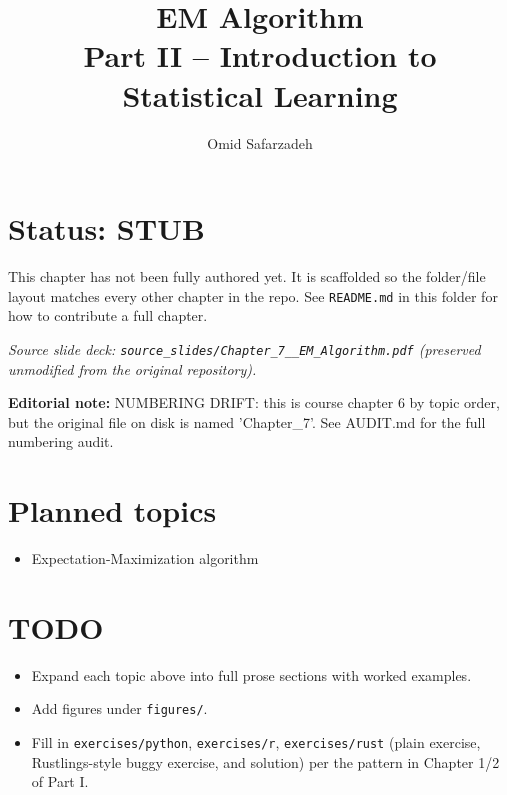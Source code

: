 \documentclass[11pt]{article}
\title{EM Algorithm \\ \large Part II -- Introduction to Statistical Learning}
\author{Omid Safarzadeh}
\date{}
\begin{document}
\maketitle

\section*{Status: STUB}
This chapter has not been fully authored yet. It is scaffolded so the
folder/file layout matches every other chapter in the repo. See
\texttt{README.md} in this folder for how to contribute a full chapter.

\textit{Source slide deck: \texttt{source\_slides/Chapter\_7\_\_EM\_Algorithm.pdf} (preserved unmodified from the original repository).}

\par\noindent\textbf{Editorial note:} NUMBERING DRIFT: this is course chapter 6 by topic order, but the original file on disk is named 'Chapter\_7'. See AUDIT.md for the full numbering audit.

\section*{Planned topics}
\begin{itemize}
  \item Expectation-Maximization algorithm
\end{itemize}

\section*{TODO}
\begin{itemize}
  \item Expand each topic above into full prose sections with worked examples.
  \item Add figures under \texttt{figures/}.
  \item Fill in \texttt{exercises/python}, \texttt{exercises/r}, \texttt{exercises/rust}
        (plain exercise, Rustlings-style buggy exercise, and solution) per the
        pattern in Chapter 1/2 of Part I.
\end{itemize}
\end{document}
